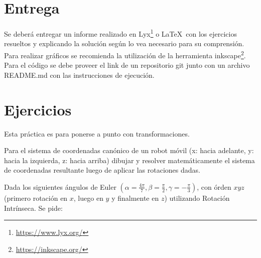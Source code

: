 \documentclass[tp]{lcc}
\begin{document}
\maketitle

\section{Entrega}
Se deberá entregar un informe realizado en Lyx\footnote{\url{https://www.lyx.org/}} o \LaTeX\ con los ejercicios resueltos y explicando la solución según lo vea necesario para su comprensión. Para realizar gráficos se recomienda la utilización de la herramienta inkscape\footnote{\url{https://inkscape.org/}}. Para el código se debe proveer el link de un repositorio git junto con un archivo README.md con las instrucciones de ejecución.

\section{Ejercicios}
Esta práctica es para ponerse a punto con transformaciones.

\ejercicio Para el sistema de coordenadas canónico de un robot móvil (x: hacia adelante, y: hacia la izquierda, z: hacia arriba) dibujar y resolver matemáticamente el sistema de coordenadas resultante luego de aplicar las rotaciones dadas.

    \begin{figure}[!h]
    \centering
    \hspace{-4cm}
    \hspace{3cm}
    \subfloat[$R_{y}(\SI{90}{\degree})$]
    {
        
    }
    \hspace{3cm}
    \hspace{3cm}
    \end{figure}
    
    
\ejercicio Dada los siguientes ángulos de Euler $(\alpha = \frac{4\pi}{7}, \beta = \frac{\pi}{2}, \gamma = -\frac{\pi}{3})$, con órden $xyz$ (primero rotación en $x$, luego en $y$ y finalmente en $z$) utilizando Rotación Intrínseca. Se pide:
\end{document}
